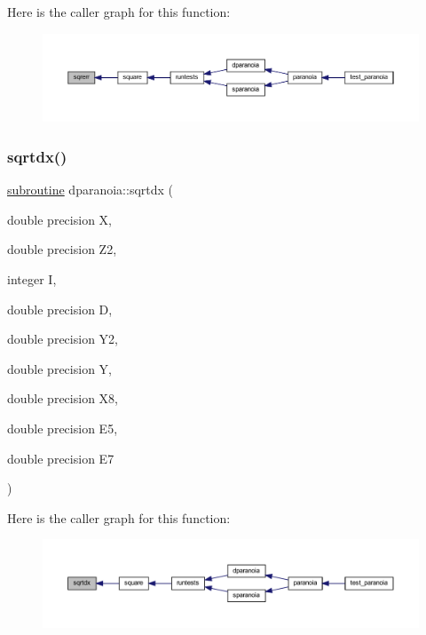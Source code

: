 Here is the caller graph for this function\+:
\nopagebreak
\begin{figure}[H]
\begin{center}
\leavevmode
\includegraphics[width=350pt]{dparanoia_8f90_a0c8227a6d55d254aa7917dc70462539e_icgraph}
\end{center}
\end{figure}
\mbox{\label{dparanoia_8f90_ac8baf7c673c51ef12f8668ada0ca5a1d}} 
\subsubsection{\texorpdfstring{sqrtdx()}{sqrtdx()}}
{\footnotesize\ttfamily \hyperlink{M__stopwatch_83_8txt_acfbcff50169d691ff02d4a123ed70482}{subroutine} dparanoia\+::sqrtdx (\begin{DoxyParamCaption}\item[{double precision}]{X,  }\item[{double precision}]{Z2,  }\item[{integer}]{I,  }\item[{double precision}]{D,  }\item[{double precision}]{Y2,  }\item[{double precision}]{Y,  }\item[{double precision}]{X8,  }\item[{double precision}]{E5,  }\item[{double precision}]{E7 }\end{DoxyParamCaption})}

Here is the caller graph for this function\+:
\nopagebreak
\begin{figure}[H]
\begin{center}
\leavevmode
\includegraphics[width=350pt]{dparanoia_8f90_ac8baf7c673c51ef12f8668ada0ca5a1d_icgraph}
\end{center}
\end{figure}
\mbox{\label{dparanoia_8f90_a3df535611e179b371692d3389d67f55e}} 
